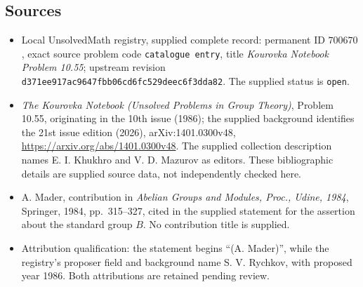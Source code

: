 \documentclass[11pt]{article}
\begin{document}
\subsection{Sources}
\begin{itemize}
\item Local UnsolvedMath registry, supplied complete record: permanent ID \(700670\), exact source problem code \texttt{catalogue entry}, title \emph{Kourovka Notebook Problem 10.55}; upstream revision \texttt{d371ee917ac9647fbb06cd6fc529deec6f3dda82}. The supplied status is \texttt{open}.
\item \emph{The Kourovka Notebook (Unsolved Problems in Group Theory)}, Problem 10.55, originating in the 10th issue (1986); the supplied background identifies the 21st issue edition (2026), arXiv:1401.0300v48, \url{https://arxiv.org/abs/1401.0300v48}. The supplied collection description names E. I. Khukhro and V. D. Mazurov as editors. These bibliographic details are supplied source data, not independently checked here.
\item A. Mader, contribution in \emph{Abelian Groups and Modules, Proc., Udine, 1984}, Springer, 1984, pp.~315--327, cited in the supplied statement for the assertion about the standard group \(B\). No contribution title is supplied.
\item Attribution qualification: the statement begins ``(A. Mader)'', while the registry's proposer field and background name S. V. Rychkov, with proposed year 1986. Both attributions are retained pending review.
\end{itemize}
\end{document}
